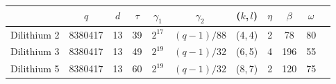 \begin{tabular}{|c|c|c|c|c|c|c|c|c|c|c|}
  \hline
    & $q$     & $d$ & $\tau$ & $\gamma_1$ & $\gamma_2$ & ($k$,\,$l$) & $\eta$ & $\beta$ & $\omega$ \\
  \hline
  Dilithium 2 & 8380417 & 13  & 39     & $2^{17}$   & $(q-1)/88$ & (4,\,4)     & 2      & 78      & 80       \\
  Dilithium 3 & 8380417 & 13  & 49     & $2^{19}$   & $(q-1)/32$ & (6,\,5)     & 4      & 196     & 55       \\
  Dilithium 5 & 8380417 & 13  & 60     & $2^{19}$   & $(q-1)/32$ & (8,\,7)     & 2      & 120     & 75       \\
  \hline
\end{tabular}
